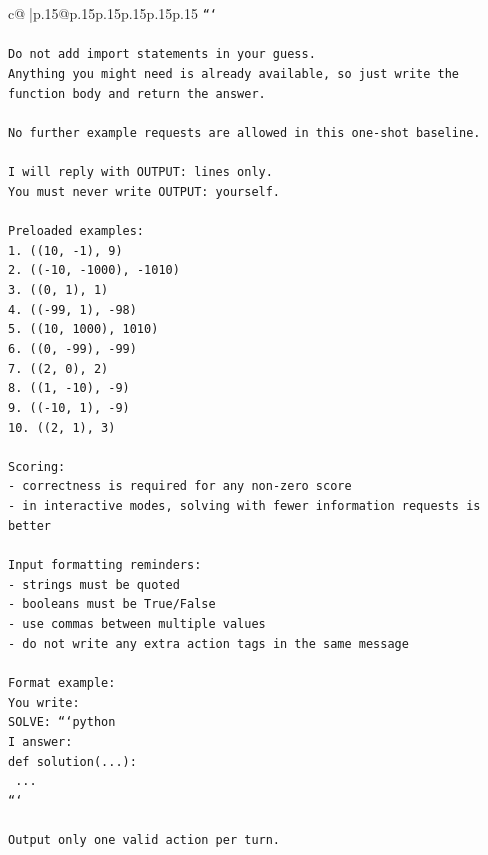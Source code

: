 \documentclass{article}
\begin{document}
{\begin{supertabular}{c@{$\;$}|p{.15\linewidth}@{}p{.15\linewidth}p{.15\linewidth}p{.15\linewidth}p{.15\linewidth}p{.15\linewidth}}
{{{\texttt{```} \\
\\ 
\texttt{Do not add import statements in your guess.} \\
\texttt{Anything you might need is already available, so just write the function body and return the answer.} \\
\\ 
\texttt{No further example requests are allowed in this one{-}shot baseline.} \\
\\ 
\texttt{I will reply with OUTPUT: lines only.} \\
\texttt{You must never write OUTPUT: yourself.} \\
\\ 
\texttt{Preloaded examples:} \\
\texttt{1. ((10, {-}1), 9)} \\
\texttt{2. (({-}10, {-}1000), {-}1010)} \\
\texttt{3. ((0, 1), 1)} \\
\texttt{4. (({-}99, 1), {-}98)} \\
\texttt{5. ((10, 1000), 1010)} \\
\texttt{6. ((0, {-}99), {-}99)} \\
\texttt{7. ((2, 0), 2)} \\
\texttt{8. ((1, {-}10), {-}9)} \\
\texttt{9. (({-}10, 1), {-}9)} \\
\texttt{10. ((2, 1), 3)} \\
\\ 
\texttt{Scoring:} \\
\texttt{{-} correctness is required for any non{-}zero score} \\
\texttt{{-} in interactive modes, solving with fewer information requests is better} \\
\\ 
\texttt{Input formatting reminders:} \\
\texttt{{-} strings must be quoted} \\
\texttt{{-} booleans must be True/False} \\
\texttt{{-} use commas between multiple values} \\
\texttt{{-} do not write any extra action tags in the same message} \\
\\ 
\texttt{Format example:} \\
\texttt{You write:} \\
\texttt{SOLVE: ```python} \\
\texttt{I answer:} \\
\texttt{def solution(...):} \\
\texttt{    ...} \\
\texttt{```} \\
\\ 
\texttt{Output only one valid action per turn.} \\
            }
        }
    }
     \\ \\


\end{supertabular}}
\end{document}
